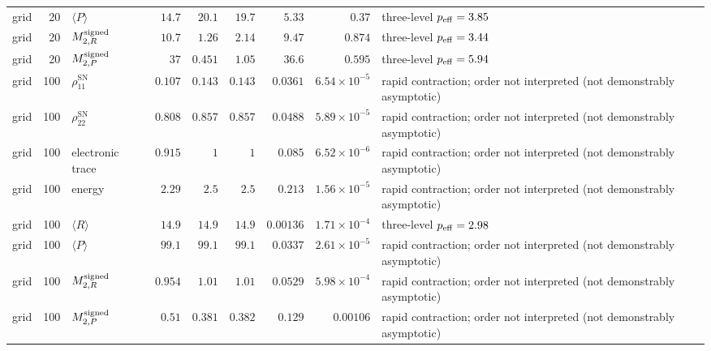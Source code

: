 \begin{landscape}
\begin{longtable}{l r l r r r r r L{0.18\textwidth}}
grid & 20 & $\langle P\rangle$ & $14.7$ & $20.1$ & $19.7$ & $5.33$ & $0.37$ & three-level $p_{\rm eff}=3.85$ \\
grid & 20 & $M^{\rm signed}_{2,R}$ & $10.7$ & $1.26$ & $2.14$ & $9.47$ & $0.874$ & three-level $p_{\rm eff}=3.44$ \\
grid & 20 & $M^{\rm signed}_{2,P}$ & $37$ & $0.451$ & $1.05$ & $36.6$ & $0.595$ & three-level $p_{\rm eff}=5.94$ \\
grid & 100 & $\rho_{11}^{\mathrm{SN}}$ & $0.107$ & $0.143$ & $0.143$ & $0.0361$ & $6.54\times10^{-5}$ & rapid contraction; order not interpreted (not demonstrably asymptotic) \\
grid & 100 & $\rho_{22}^{\mathrm{SN}}$ & $0.808$ & $0.857$ & $0.857$ & $0.0488$ & $5.89\times10^{-5}$ & rapid contraction; order not interpreted (not demonstrably asymptotic) \\
grid & 100 & electronic trace & $0.915$ & $1$ & $1$ & $0.085$ & $6.52\times10^{-6}$ & rapid contraction; order not interpreted (not demonstrably asymptotic) \\
grid & 100 & energy & $2.29$ & $2.5$ & $2.5$ & $0.213$ & $1.56\times10^{-5}$ & rapid contraction; order not interpreted (not demonstrably asymptotic) \\
grid & 100 & $\langle R\rangle$ & $14.9$ & $14.9$ & $14.9$ & $0.00136$ & $1.71\times10^{-4}$ & three-level $p_{\rm eff}=2.98$ \\
grid & 100 & $\langle P\rangle$ & $99.1$ & $99.1$ & $99.1$ & $0.0337$ & $2.61\times10^{-5}$ & rapid contraction; order not interpreted (not demonstrably asymptotic) \\
grid & 100 & $M^{\rm signed}_{2,R}$ & $0.954$ & $1.01$ & $1.01$ & $0.0529$ & $5.98\times10^{-4}$ & rapid contraction; order not interpreted (not demonstrably asymptotic) \\
grid & 100 & $M^{\rm signed}_{2,P}$ & $0.51$ & $0.381$ & $0.382$ & $0.129$ & $0.00106$ & rapid contraction; order not interpreted (not demonstrably asymptotic) \\
\end{longtable}
\endgroup
\end{landscape}

